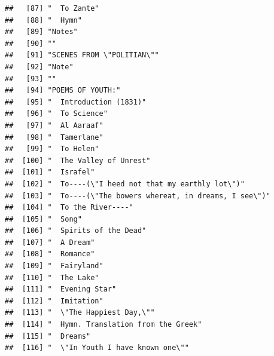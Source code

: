 \documentclass{article}\usepackage[]{graphicx}\usepackage[]{color}
\makeatletter
\newenvironment{kframe}{%
 \def\at@end@of@kframe{}%
 \ifinner\ifhmode%
  \def\at@end@of@kframe{\end{minipage}}%
  \begin{minipage}{\columnwidth}%
 \fi\fi%
 \def\FrameCommand##1{\hskip\@totalleftmargin \hskip-\fboxsep
 \colorbox{shadecolor}{##1}\hskip-\fboxsep
     \hskip-\linewidth \hskip-\@totalleftmargin \hskip\columnwidth}%
 \MakeFramed {\advance\hsize-\width
   \@totalleftmargin\z@ \linewidth\hsize
   \@setminipage}}%
 {\par\unskip\endMakeFramed%
 \at@end@of@kframe}
\newenvironment{knitrout}{}{} %
\makeatother
\begin{document}
\begin{knitrout}
\begin{kframe}
\begin{verbatim}
##   [87] "  To Zante"                                                                  
##   [88] "  Hymn"                                                                      
##   [89] "Notes"                                                                       
##   [90] ""                                                                            
##   [91] "SCENES FROM \"POLITIAN\""                                                    
##   [92] "Note"                                                                        
##   [93] ""                                                                            
##   [94] "POEMS OF YOUTH:"                                                             
##   [95] "  Introduction (1831)"                                                       
##   [96] "  To Science"                                                                
##   [97] "  Al Aaraaf"                                                                 
##   [98] "  Tamerlane"                                                                 
##   [99] "  To Helen"                                                                  
##  [100] "  The Valley of Unrest"                                                      
##  [101] "  Israfel"                                                                   
##  [102] "  To----(\"I heed not that my earthly lot\")"                                
##  [103] "  To----(\"The bowers whereat, in dreams, I see\")"                          
##  [104] "  To the River----"                                                          
##  [105] "  Song"                                                                      
##  [106] "  Spirits of the Dead"                                                       
##  [107] "  A Dream"                                                                   
##  [108] "  Romance"                                                                   
##  [109] "  Fairyland"                                                                 
##  [110] "  The Lake"                                                                  
##  [111] "  Evening Star"                                                              
##  [112] "  Imitation"                                                                 
##  [113] "  \"The Happiest Day,\""                                                     
##  [114] "  Hymn. Translation from the Greek"                                          
##  [115] "  Dreams"                                                                    
##  [116] "  \"In Youth I have known one\""                                             

\end{verbatim}
\end{kframe}
\end{knitrout}
\end{document}
